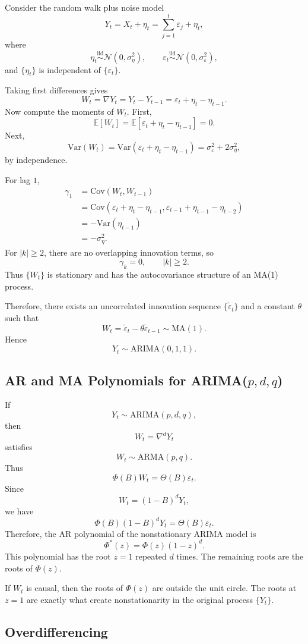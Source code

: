 \documentclass[12pt,oneside]{book}
\numberwithin{equation}{section}
\theoremstyle{definition}
\theoremstyle{plain}
\theoremstyle{remark}
\newcommand{\E}{\mathbb{E}}
\newcommand{\Var}{\mathrm{Var}}
\newcommand{\Cov}{\mathrm{Cov}}
\newcommand{\iid}{\overset{\text{iid}}{\sim}}
\newcommand{\Normal}{\mathcal{N}}
\begin{document}
Consider the random walk plus noise model
\[
Y_t=X_t+\eta_t
=
\sum_{j=1}^t\varepsilon_j+\eta_t,
\]
where
\[
\eta_t\iid \Normal(0,\sigma_\eta^2),
\qquad
\varepsilon_t\iid \Normal(0,\sigma_\varepsilon^2),
\]
and $\{\eta_t\}$ is independent of $\{\varepsilon_t\}$.

Taking first differences gives
\[
W_t
=
\nabla Y_t
=
Y_t-Y_{t-1}
=
\varepsilon_t+\eta_t-\eta_{t-1}.
\]
Now compute the moments of $W_t$. First,
\[
\E[W_t]
=
\E[\varepsilon_t+\eta_t-\eta_{t-1}]
=
0.
\]
Next,
\[
\Var(W_t)
=
\Var(\varepsilon_t+\eta_t-\eta_{t-1})
=
\sigma_\varepsilon^2+2\sigma_\eta^2,
\]
by independence.

For lag $1$,
\begin{align*}
\gamma_1
&=
\Cov(W_t,W_{t-1}) \\
&=
\Cov(\varepsilon_t+\eta_t-\eta_{t-1},
\varepsilon_{t-1}+\eta_{t-1}-\eta_{t-2}) \\
&=
-\Var(\eta_{t-1}) \\
&=
-\sigma_\eta^2.
\end{align*}
For $|k|\geq 2$, there are no overlapping innovation terms, so
\[
\gamma_k=0,
\qquad |k|\geq 2.
\]
Thus $\{W_t\}$ is stationary and has the autocovariance structure of an MA(1) process.

Therefore, there exists an uncorrelated innovation sequence $\{\widetilde{\varepsilon}_t\}$ and a constant $\theta$ such that
\[
W_t
=
\widetilde{\varepsilon}_t-\theta\widetilde{\varepsilon}_{t-1}
\sim \mathrm{MA}(1).
\]
Hence
\[
Y_t\sim \mathrm{ARIMA}(0,1,1).
\]

\subsection{AR and MA Polynomials for ARIMA($p,d,q$)}

If
\[
Y_t\sim \mathrm{ARIMA}(p,d,q),
\]
then
\[
W_t=\nabla^dY_t
\]
satisfies
\[
W_t\sim \mathrm{ARMA}(p,q).
\]
Thus
\[
\Phi(B)W_t=\Theta(B)\varepsilon_t.
\]
Since
\[
W_t=(1-B)^dY_t,
\]
we have
\[
\Phi(B)(1-B)^dY_t=\Theta(B)\varepsilon_t.
\]
Therefore, the AR polynomial of the nonstationary ARIMA model is
\[
\Phi^\ast(z)
=
\Phi(z)(1-z)^d.
\]
This polynomial has the root $z=1$ repeated $d$ times. The remaining roots are the roots of $\Phi(z)$.

If $W_t$ is causal, then the roots of $\Phi(z)$ are outside the unit circle. The roots at $z=1$ are exactly what create nonstationarity in the original process $\{Y_t\}$.

\subsection{Overdifferencing}
\end{document}
